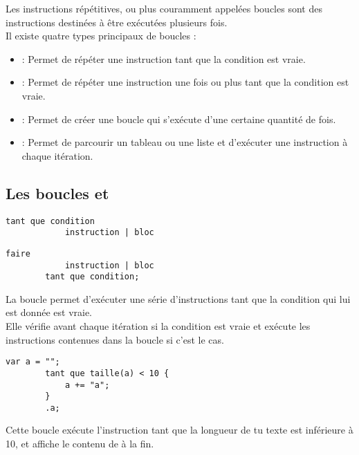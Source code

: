 \documentclass[../userguide.tex]{subfiles}
\begin{document}
    Les instructions répétitives, ou plus couramment appelées boucles sont des instructions destinées à être exécutées
    plusieurs fois.\\
    Il existe quatre types principaux de boucles :
    \begin{itemize}
        \item {} : Permet de répéter une instruction tant que la condition est vraie.
        \item {} : Permet de répéter une instruction une fois ou plus tant que la condition est
        vraie.
        \item {} : Permet de créer une boucle qui s'exécute d'une certaine quantité de fois.
        \item {} : Permet de parcourir un tableau ou une liste et d'exécuter une instruction à chaque
        itération.
    \end{itemize}

    \subsection{Les boucles  et } \label{subsec:boucle-tant-que}
    \parindent
    \begin{lstlisting}[label=lst:boucle-tant-que-syntaxe]
        tant que condition
            instruction | bloc
    \end{lstlisting}

    \begin{lstlisting}[label=lst:boucle-faire-tant-que-syntaxe]
        faire
            instruction | bloc
        tant que condition;
    \end{lstlisting}
    \divider

    La boucle  permet d'exécuter une série d'instructions tant que la condition qui lui est
    donnée est vraie. \\
    Elle vérifie avant chaque itération si la condition est vraie et exécute les instructions contenues dans la boucle
    si c'est le cas.

    \begin{lstlisting}[label=lst:boucle-ex-1]
        var a = "";
        tant que taille(a) < 10 {
            a += "a";
        }
        .a;
    \end{lstlisting}

    Cette boucle exécute l'instruction  tant que la longueur de tu texte  est inférieure à 10,
    et affiche le contenu de  à la fin.
\end{document}
